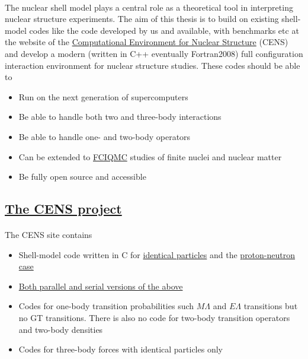\documentclass[%
oneside,                 %
final,                   %
10pt]{article}
\begin{document}
\paragraph{}
The nuclear shell model 
plays a central role as a theoretical tool in interpreting nuclear
structure experiments. The aim of this thesis is to build on existing
shell-model codes like the code developed by us and available, with
benchmarks etc at the website of the \href{{https://github.com/ManyBodyPhysics/CENS}}{Computational Environment for
Nuclear Structure} (CENS)
and develop a modern (written in C++ eventually Fortran2008) full
configuration interaction environment for nuclear structure
studies. These codes should be able to 
\begin{itemize}
\item Run on the next generation of supercomputers 

\item Be able to handle both two and three-body interactions 

\item Be able to handle one- and two-body operators 

\item Can be extended to \href{{https://www.duo.uio.no/bitstream/handle/10852/37172/master.pdf?sequence=1}}{FCIQMC} studies of finite nuclei and nuclear matter

\item Be fully open source and accessible
\end{itemize}

\noindent



\subsection{\href{{https://github.com/ManyBodyPhysics/CENS}}{The CENS project}}

\paragraph{}
The CENS  site contains 
\begin{itemize}
\item Shell-model code written in C for \href{{https://github.com/ManyBodyPhysics/CENS/tree/master/FCI/serial/IdenticalParticles}}{identical particles} and the \href{{https://github.com/ManyBodyPhysics/CENS/tree/master/FCI/serial/pnCase}}{proton-neutron case}

\item \href{{https://github.com/ManyBodyPhysics/CENS/tree/master/FCI}}{Both parallel and serial versions of the above}

\item Codes for one-body transition probabilities such $M\Lambda$ and $E\Lambda$ transitions but no GT transitions. There is also no code for two-body transition operators and two-body densities

\item Codes for three-body forces with identical particles only
\end{itemize}
\end{document}
